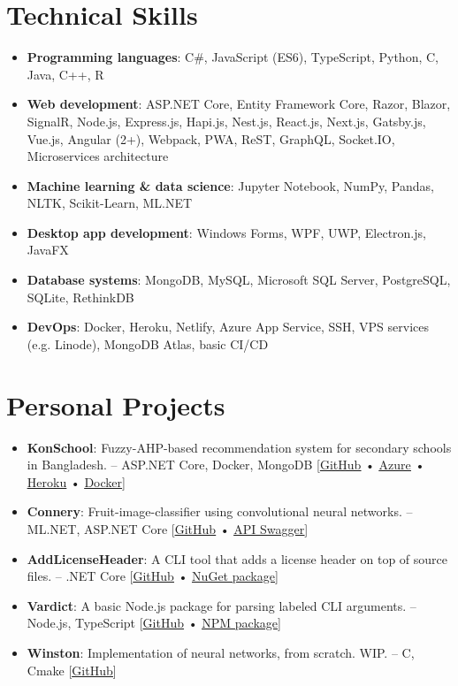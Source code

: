 \documentclass[a4-paper,10pt]{article}
\newcommand{\resumeItem}[2]{
  \item\small{
    \textbf{#1}{: #2 \vspace{-2pt}}
  }
}
\newcommand{\resumeSubItem}[2]{\resumeItem{#1}{#2}\vspace{-3pt}}
\newcommand{\resumeSubHeadingListStart}{\begin{itemize}[leftmargin=*]}
\newcommand{\resumeSubHeadingListEnd}{\end{itemize}}
\begin{document}
\section{Technical Skills}
  \resumeSubHeadingListStart
    \resumeSubItem{Programming languages}
      {C\#, JavaScript (ES6), TypeScript, Python, C, Java, C++, R}
    \resumeSubItem{Web development}
      {ASP.NET Core, Entity Framework Core, Razor, Blazor, SignalR, Node.js, Express.js, Hapi.js, Nest.js, React.js, Next.js, Gatsby.js, Vue.js, Angular (2+), Webpack, PWA, ReST, GraphQL, Socket.IO, Microservices architecture}
    \resumeSubItem{Machine learning \& data science}
      {Jupyter Notebook, NumPy, Pandas, NLTK, Scikit-Learn, ML.NET}
    \resumeSubItem{Desktop app development}
      {Windows Forms, WPF, UWP, Electron.js, JavaFX}
    \resumeSubItem{Database systems}
      {MongoDB, MySQL, Microsoft SQL Server, PostgreSQL, SQLite, RethinkDB}
    \resumeSubItem{DevOps}
      {Docker, Heroku, Netlify, Azure App Service, SSH, VPS services (e.g. Linode), MongoDB Atlas, basic CI/CD}
  \resumeSubHeadingListEnd

\vspace{-3pt}

\section{Personal Projects}
  \resumeSubHeadingListStart
    \resumeSubItem{KonSchool}
      {Fuzzy-AHP-based recommendation system for secondary schools in Bangladesh. -- ASP.NET Core, Docker, MongoDB [\href{https://github.com/maacpiash/KonSchool}{\underline{GitHub}} • \href{https://konschool.azurewebsites.net/}{\underline{Azure}} • \href{https://konschool.herokuapp.com}{\underline{Heroku}} • \href{https://hub.docker.com/r/maacpiash/konschool}{\underline{Docker}}]}
    \resumeSubItem{Connery}
      {Fruit-image-classifier using convolutional neural networks. -- ML.NET, ASP.NET Core [\href{https://github.com/maacpiash/Connery}{\underline{GitHub}} • \href{https://connery-api.herokuapp.com}{\underline{API Swagger}}]}
    \resumeSubItem{AddLicenseHeader}
      {A CLI tool that adds a license header on top of source files. -- .NET Core [\href{https://github.com/maacpiash/addlh}{\underline{GitHub}} • \href{https://www.nuget.org/packages/AddLicenseHeader}{\underline{NuGet package}}]}
    \resumeSubItem{Vardict}
      {A basic Node.js package for parsing labeled CLI arguments. -- Node.js, TypeScript [\href{https://github.com/maacpiash/vardict}{\underline{GitHub}} • \href{https://www.npmjs.com/package/vardict/}{\underline{NPM package}}]}
    \resumeSubItem{Winston}
      {Implementation of neural networks, from scratch. WIP. -- C, Cmake [\href{https://github.com/maacpiash/Winston}{\underline{GitHub}}]}
  \resumeSubHeadingListEnd
  
\end{document}
